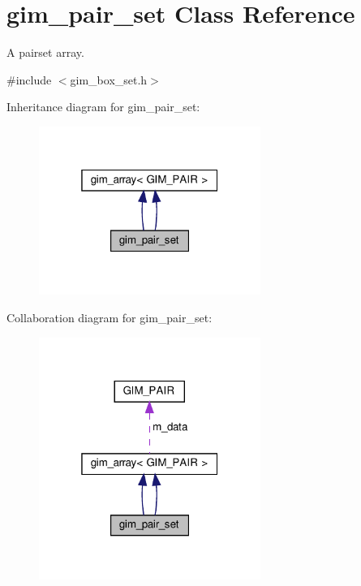\hypertarget{classgim__pair__set}{}\section{gim\+\_\+pair\+\_\+set Class Reference}
\label{classgim__pair__set}


A pairset array.  




{\ttfamily \#include $<$gim\+\_\+box\+\_\+set.\+h$>$}



Inheritance diagram for gim\+\_\+pair\+\_\+set\+:
\nopagebreak
\begin{figure}[H]
\begin{center}
\leavevmode
\includegraphics[width=205pt]{classgim__pair__set__inherit__graph}
\end{center}
\end{figure}


Collaboration diagram for gim\+\_\+pair\+\_\+set\+:
\nopagebreak
\begin{figure}[H]
\begin{center}
\leavevmode
\includegraphics[width=205pt]{classgim__pair__set__coll__graph}
\end{center}
\end{figure}
